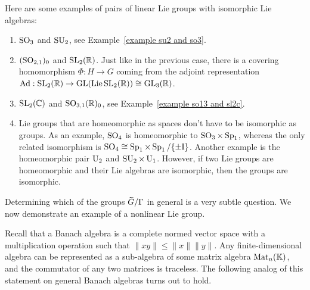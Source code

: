 \begin{example}
    Here are some examples of pairs of linear Lie groups with isomorphic Lie algebras:
    \begin{enumerate}
        \item $\operatorname{SO}_3$ and $\operatorname{SU}_2$, see Example~\ref{example su2 and so3}.
        \item $(\operatorname{SO}_{2,1})_0$ and $\operatorname{SL}_2(\mathbb{R})$. Just like in the previous case, there is a covering homomorphism $\Phi:H\to G$ coming from the adjoint representation $\mathrm{Ad}:\operatorname{SL}_2(\mathbb{R})\to \operatorname{GL}(\operatorname{Lie} \operatorname{SL}_2(\mathbb{R}))\cong \operatorname{GL}_3(\mathbb{R})$.
        \item $\operatorname{SL}_2(\mathbb{C})$ and $\operatorname{SO}_{3,1}(\mathbb{R})_0$, see Example~\ref{example so13 and sl2c}.
        \item Lie groups that are homeomorphic as spaces don't have to be isomorphic as groups. As an example, $\operatorname{SO}_4$ is homeomorphic to $\operatorname{SO}_3\times \operatorname{Sp}_1$, whereas the only related isomorphism is $\operatorname{SO}_4\cong \operatorname{Sp}_1\times\operatorname{Sp}_1\slash \{\pm \mathrm{I}\}$. Another example is the homeomorphic pair $\operatorname{U}_2$ and $\operatorname{SU}_2\times \operatorname{U}_1$. However, if two Lie groups are homeomorphic and their Lie algebras are isomorphic, then the groups are isomorphic.
    \end{enumerate}
\end{example}


Determining which of the groups $\wt{G}\slash \Gamma$ in general is a very subtle question. We now demonstrate an example of a nonlinear Lie group. 

Recall that a Banach algebra is a complete normed vector space with a multiplication operation such that $\lVert xy\rVert\leq \lVert x\rVert \lVert y\rVert$. Any finite-dimensional algebra can be represented as a sub-algebra of some matrix algebra $\operatorname{Mat}_n(\mathbb{K})$, and the commutator of any two matrices is traceless. The following analog of this statement on general Banach algebras turns out to hold.

